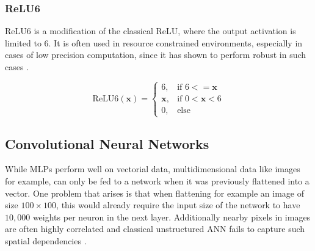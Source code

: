 \subsubsection{ReLU6}

ReLU6 is a modification of the classical \ac{ReLU}, where the output activation is limited to 6.
It is often used in resource constrained environments, especially in cases of low precision computation, since it has shown to perform robust in such cases \cite{mnetv1}.

\begin{equation}
    \text{ReLU6}(\mathbf{x}) =
    \begin{cases}
        6, & \text{if } 6 <= \mathbf{x}\\
        \mathbf{x}, & \text{if } 0 < \mathbf{x} < 6\\
        0, & \text{else}
    \end{cases}
\end{equation}






\subsection{Convolutional Neural Networks}

While \acp{MLP} perform well on vectorial data, multidimensional data like images for example, can only be fed to a network when it was previously flattened into a vector.
One problem that arises is that when flattening for example an image of size $100 \times 100$, this would already require the input size of the network to have $10,000$ weights per neuron in the next layer.
Additionally nearby pixels in images are often highly correlated and classical unstructured \ac{ANN} fails to capture such spatial dependencies \cite{lecun_lenet}.

